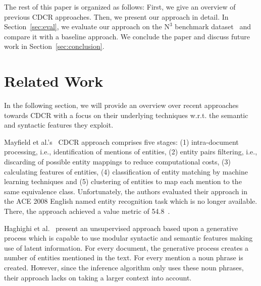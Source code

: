 \documentclass{llncs}
\begin{document}
The rest of this paper is organized as follows:
First, we give an overview of previous CDCR approaches.
Then, we present our approach in detail.
In Section~\ref{sec:eval}, we evaluate our approach on the $\mbox{N}^3$ benchmark dataset~\cite{N3} and compare it with a baseline approach.
We conclude the paper and discuss future work in Section~\ref{sec:conclusion}.



\section{Related Work}
\label{sec:sota}
In the following section, we will provide an overview over recent approaches towards CDCR with a focus on their underlying techniques w.r.t. the semantic and syntactic features they exploit.

Mayfield et al.'s~\cite{mayfield2009cross} CDCR approach comprises five stages: (1) intra-document processing, i.e., identification of mentions of entities, (2) entity pairs filtering, i.e., discarding of possible entity mappings to reduce computational costs, (3) calculating features of entities, (4) classification of entity matching by machine learning techniques and (5) clustering of entities to map each mention to the same equivalence class.
Unfortunately, the authors evaluated their approach in the ACE 2008 English named entity recognition task which is no longer available.
There, the approach achieved a value metric of 54.8~\cite{citeulike:5297302}.

Haghighi et al.~\cite{haghighi-klein:2010:NAACLHLT} present an unsupervised approach based upon a generative process which is capable to use modular syntactic and semantic features making use of latent information.
For every document, the generative process creates a number of entities mentioned in the text.
For every mention a noun phrase is created.
However, since the inference algorithm only uses these noun phrases, their approach lacks on taking a larger context into account.
\end{document}
